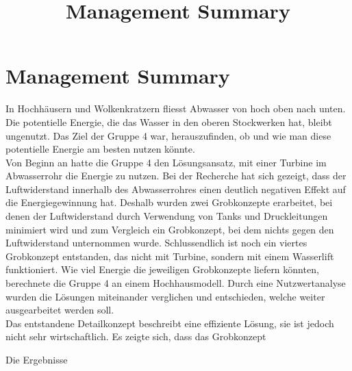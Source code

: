 \documentclass[12pt]{article}
\title{Management Summary}
\begin{document}
\section*{Management Summary}
In Hochhäusern und Wolkenkratzern fliesst Abwasser von hoch oben nach unten. Die potentielle Energie, die das Wasser in den oberen Stockwerken hat, bleibt ungenutzt. Das Ziel der Gruppe 4 war, herauszufinden, ob und wie man diese potentielle Energie am besten nutzen könnte.\\


Von Beginn an hatte die Gruppe 4 den Lösungsansatz, mit einer Turbine im Abwasserrohr die Energie zu nutzen. Bei der Recherche hat sich gezeigt, dass der Luftwiderstand innerhalb des Abwasserrohres einen deutlich negativen Effekt auf die Energiegewinnung hat. Deshalb wurden zwei Grobkonzepte erarbeitet, bei denen der Luftwiderstand durch Verwendung von Tanks und Druckleitungen minimiert wird und zum Vergleich ein Grobkonzept, bei dem nichts gegen den Luftwiderstand unternommen wurde. Schlussendlich ist noch ein viertes Grobkonzept entstanden, das nicht mit Turbine, sondern mit einem Wasserlift funktioniert. Wie viel Energie die jeweiligen Grobkonzepte liefern könnten, berechnete die Gruppe 4 an einem Hochhausmodell. Durch eine Nutzwertanalyse wurden die Lösungen miteinander verglichen und entschieden, welche weiter ausgearbeitet werden soll.\\

Das entstandene Detailkonzept beschreibt eine effiziente Lösung, sie ist jedoch nicht sehr wirtschaftlich. 
Es zeigte sich, dass das Grobkonzept


Die Ergebnisse 
\end{document}
